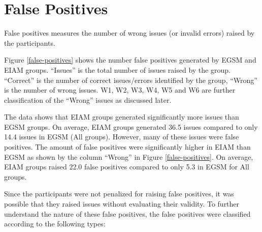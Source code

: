 \section{False Positives}

False positives measures the number of wrong issues (or
invalid errors) raised by the participants.

Figure \ref{false-positives} shows the number false
positives generated by EGSM and EIAM groups. ``Issues'' is
the total number of issues raised by the group. ``Correct''
is the number of correct issues/errors identified by the
group, ``Wrong'' is the number of wrong issues. W1, W2, W3,
W4, W5 and W6 are further classification of the ``Wrong''
issues as discussed later.

The data shows that EIAM groups generated significantly more
issues than EGSM groups.  On average, EIAM groups generated
36.5 issues compared to only 14.4 issues in EGSM (All
groups).  However, many of these issues were false
positives. The amount of false positives were significantly
higher in EIAM than EGSM as shown by the column ``Wrong'' in
Figure \ref{false-positives}.  On average, EIAM groups
raised 22.0 false positives compared to only 5.3 in EGSM for
All groups.

Since the participants were not penalized for raising false
positives, it was possible that they raised issues without
evaluating their validity.  To further understand the nature
of these false positives, the false positives were
classified according to the following types:

